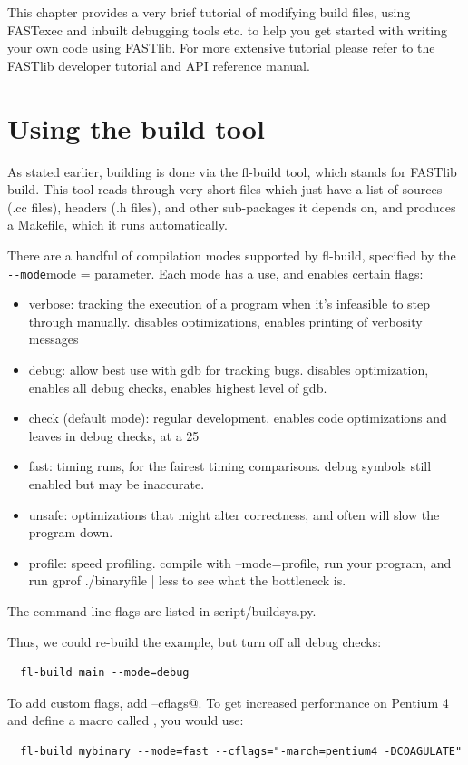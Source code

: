 \documentclass[letter]{report}
\begin{document}
This chapter provides a very brief tutorial of modifying build files, using FASTexec and inbuilt debugging tools etc. to help you get started with writing your own code using FASTlib. For more extensive tutorial please refer to the FASTlib developer tutorial and API reference manual.

\section {Using the build tool}

As stated earlier, building is done via the fl-build tool, which stands for FASTlib build. This tool reads through very short files which just have a list of sources (.cc files), headers (.h files), and other sub-packages it depends on, and produces a Makefile, which it runs automatically.

There are a handful of compilation modes supported by fl-build, specified by the \verb = --mode=mode = parameter. Each mode has a use, and enables certain flags:
\begin{itemize}
\item verbose: tracking the execution of a program when it's infeasible to step through manually. disables optimizations, enables printing of verbosity messages
\item debug: allow best use with gdb for tracking bugs. disables optimization, enables all debug checks, enables highest level of gdb.
\item check (default mode): regular development. enables code optimizations and leaves in debug checks, at a 25%
\item fast: timing runs, for the fairest timing comparisons. debug symbols still enabled but may be inaccurate.
\item unsafe: optimizations that might alter correctness, and often will slow the program down.
\item profile: speed profiling. compile with --mode=profile, run your program, and run gprof ./binaryfile | less to see what the bottleneck is. 
\end{itemize}
The command line flags are listed in script/buildsys.py. 

Thus, we could re-build the example, but turn off all debug checks:
\begin{verbatim}
  fl-build main --mode=debug
\end{verbatim}
To add custom flags, add \verb@--cflags@. To get increased performance on Pentium 4 and define a macro called \verb@COAGULATE@, you would use:
\begin{verbatim}
  fl-build mybinary --mode=fast --cflags="-march=pentium4 -DCOAGULATE"
\end{verbatim}
\end{document}
